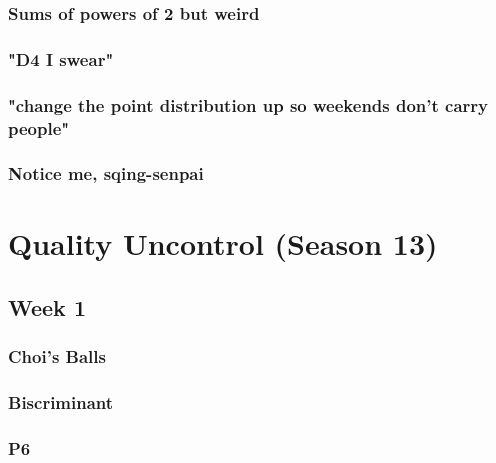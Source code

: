 \documentclass[titlepage=true]{scrartcl}
\begin{document}
    \subsubsection{Sums of powers of 2 but weird}
	\label{12-2-4}
	
	\newpage

	\subsubsection{"D4 I swear"}
	\label{12-2-5}
	
	\newpage

    \subsubsection{"change the point distribution up so weekends don't carry people"}
	\label{12-2-6}
	
	\newpage

	\subsubsection{Notice me, sqing-senpai}
	\label{12-2-7}
	
	\newpage

\section{Quality Uncontrol (Season 13)}

    \subsection{Week 1}
        
    \subsubsection{Choi's Balls}
	\label{13-1-1}
	
	\newpage

    \subsubsection{Biscriminant}
	\label{13-1-2}
	
	\newpage
    
    \subsubsection{ P6}
	\label{13-1-3}
	
	\newpage
\end{document}
